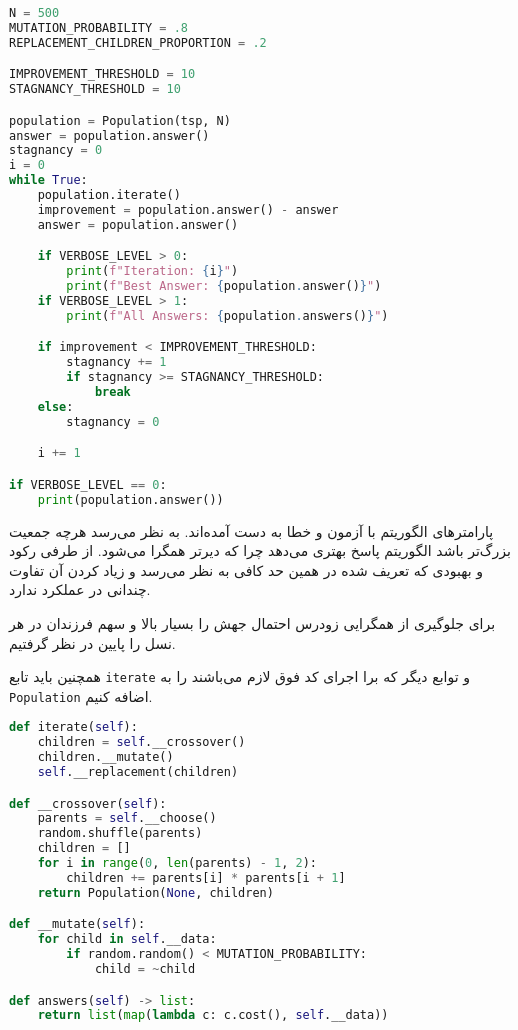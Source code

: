 \documentclass[a4paper, 12pt]{article}
\theoremstyle{definition}
\begin{document}
\LTR
\begin{lstlisting}[language=Python]
N = 500
MUTATION_PROBABILITY = .8
REPLACEMENT_CHILDREN_PROPORTION = .2

IMPROVEMENT_THRESHOLD = 10
STAGNANCY_THRESHOLD = 10

population = Population(tsp, N)
answer = population.answer()
stagnancy = 0
i = 0
while True:
    population.iterate()
    improvement = population.answer() - answer
    answer = population.answer()

    if VERBOSE_LEVEL > 0:
        print(f"Iteration: {i}")
        print(f"Best Answer: {population.answer()}")
    if VERBOSE_LEVEL > 1:
        print(f"All Answers: {population.answers()}")

    if improvement < IMPROVEMENT_THRESHOLD:
        stagnancy += 1
        if stagnancy >= STAGNANCY_THRESHOLD:
            break
    else:
        stagnancy = 0

    i += 1

if VERBOSE_LEVEL == 0:
    print(population.answer())    
\end{lstlisting}
\RTL

پارامترهای الگوریتم با آزمون و خطا به دست آمده‌اند. به نظر می‌رسد هرچه جمعیت بزرگ‌تر باشد الگوریتم پاسخ بهتری می‌دهد چرا که دیرتر همگرا می‌شود. از طرفی رکود و بهبودی که تعریف شده در همین حد کافی به نظر می‌رسد و زیاد کردن آن تفاوت چندانی در عملکرد ندارد.

برای جلوگیری از همگرایی زودرس احتمال جهش را بسیار بالا و سهم فرزندان در هر نسل را پایین در نظر گرفتیم.

همچنین باید تابع
\texttt{iterate}
و توابع دیگر که برا اجرای کد فوق لازم می‌باشند را به
\texttt{Population}
اضافه کنیم.

\LTR
\begin{lstlisting}[language=Python]
def iterate(self):
    children = self.__crossover()
    children.__mutate()
    self.__replacement(children)

def __crossover(self):
    parents = self.__choose()
    random.shuffle(parents)
    children = []
    for i in range(0, len(parents) - 1, 2):
        children += parents[i] * parents[i + 1]
    return Population(None, children)

def __mutate(self):
    for child in self.__data:
        if random.random() < MUTATION_PROBABILITY:
            child = ~child

def answers(self) -> list:
    return list(map(lambda c: c.cost(), self.__data))
\end{lstlisting}
\RTL
\end{document}
